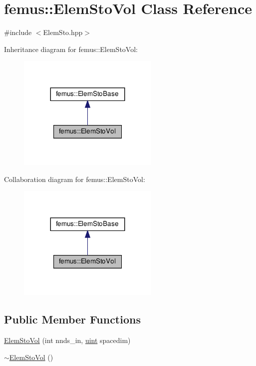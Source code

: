 \hypertarget{classfemus_1_1_elem_sto_vol}{}\section{femus\+:\+:Elem\+Sto\+Vol Class Reference}
\label{classfemus_1_1_elem_sto_vol}


{\ttfamily \#include $<$Elem\+Sto.\+hpp$>$}



Inheritance diagram for femus\+:\+:Elem\+Sto\+Vol\+:
\nopagebreak
\begin{figure}[H]
\begin{center}
\leavevmode
\includegraphics[width=191pt]{classfemus_1_1_elem_sto_vol__inherit__graph}
\end{center}
\end{figure}


Collaboration diagram for femus\+:\+:Elem\+Sto\+Vol\+:
\nopagebreak
\begin{figure}[H]
\begin{center}
\leavevmode
\includegraphics[width=191pt]{classfemus_1_1_elem_sto_vol__coll__graph}
\end{center}
\end{figure}
\subsection*{Public Member Functions}
\begin{DoxyCompactItemize}
\item 
\mbox{\hyperlink{classfemus_1_1_elem_sto_vol_a8bcc9da426122d9905a5ce0071f7398f}{Elem\+Sto\+Vol}} (int nnds\+\_\+in, \mbox{\hyperlink{_typedefs_8hpp_a91ad9478d81a7aaf2593e8d9c3d06a14}{uint}} spacedim)
\item 
\mbox{\hyperlink{classfemus_1_1_elem_sto_vol_a9a35cdb47e6ea0c722ae92c868f06983}{$\sim$\+Elem\+Sto\+Vol}} ()
\end{DoxyCompactItemize}
